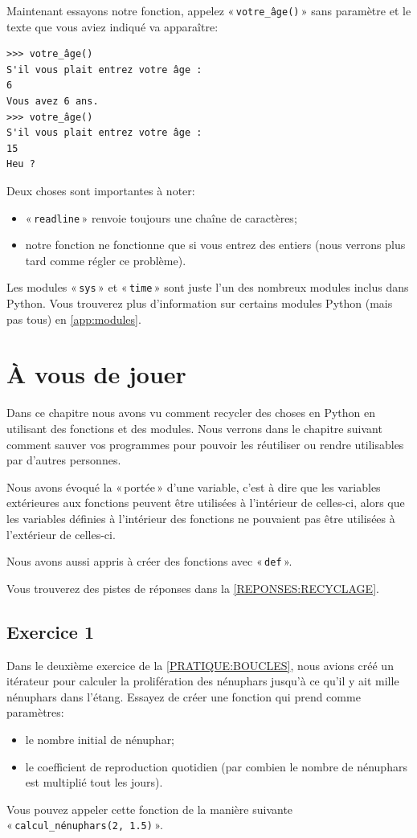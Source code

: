 Maintenant essayons notre fonction, appelez  « \texttt{votre\_âge()} » sans paramètre et le texte que vous aviez indiqué va apparaître:

\begin{Verbatim}[frame=single,rulecolor=\color{mbleu}, label=à taper]
>>> votre_âge()
S'il vous plait entrez votre âge :
6
Vous avez 6 ans.
>>> votre_âge()
S'il vous plait entrez votre âge :
15
Heu ?
\end{Verbatim}

Deux choses sont importantes à noter:
\begin{itemize}
\item « \texttt{readline} » renvoie toujours une chaîne de caractères;
\item notre fonction ne fonctionne que si vous entrez des entiers (nous verrons plus tard comme régler ce problème).
\end{itemize}

Les modules « \texttt{sys} »  et « \texttt{time} »  sont juste l'un des nombreux modules inclus dans Python. Vous trouverez plus d'information sur certains modules Python (mais pas tous) en \autoref{app:modules}.

\section{À vous de jouer\label{PRATIQUE:RECYCLAGE}}
Dans ce chapitre nous avons vu comment recycler des choses en Python en utilisant des fonctions et des modules.
Nous verrons dans le chapitre suivant comment sauver vos programmes pour pouvoir les réutiliser ou rendre utilisables par d'autres personnes.

Nous avons évoqué la « portée » d'une variable, c'est à dire que les variables extérieures aux fonctions peuvent être utilisées à l'intérieur de celles-ci, alors que les variables définies à l'intérieur des fonctions ne pouvaient pas être utilisées à l'extérieur de celles-ci.

Nous avons aussi appris à créer des fonctions avec « \texttt{def} ».

Vous trouverez des pistes de réponses dans la \autoref{REPONSES:RECYCLAGE}.


\subsection{Exercice 1}
Dans le deuxième exercice de la \autoref{PRATIQUE:BOUCLES}, nous avions créé un itérateur pour calculer la prolifération des nénuphars jusqu'à ce qu'il y ait mille nénuphars dans l'étang.
Essayez de créer une fonction qui prend comme paramètres:
\begin{itemize}
\item le nombre initial de nénuphar;
\item le coefficient de reproduction quotidien (par combien le nombre de nénuphars est multiplié tout les jours).
\end{itemize}
Vous pouvez appeler cette fonction de la manière suivante « \texttt{calcul\_nénuphars(2, 1.5)} ».

